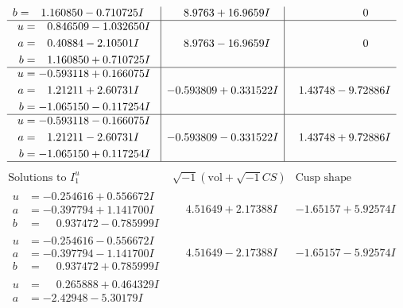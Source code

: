 \documentclass[1p]{elsarticle_modified}
\theoremstyle{definition}
\newcommand{\I}{\sqrt{-1}}
\begin{document}
$$\begin{array}{c|c|c}
\begin{aligned}
b &= \phantom{-}1.160850 - 0.710725 I\end{aligned}
 & \phantom{-}8.9763 + 16.9659 I & \phantom{-0.000000 } 0 \\ \hline\begin{aligned}
u &= \phantom{-}0.846509 - 1.032650 I \\
a &= \phantom{-}0.40884 - 2.10501 I \\
b &= \phantom{-}1.160850 + 0.710725 I\end{aligned}
 & \phantom{-}8.9763 - 16.9659 I & \phantom{-0.000000 } 0 \\ \hline\begin{aligned}
u &= -0.593118 + 0.166075 I \\
a &= \phantom{-}1.21211 + 2.60731 I \\
b &= -1.065150 - 0.117254 I\end{aligned}
 & -0.593809 + 0.331522 I & \phantom{-}1.43748 - 9.72886 I \\ \hline\begin{aligned}
u &= -0.593118 - 0.166075 I \\
a &= \phantom{-}1.21211 - 2.60731 I \\
b &= -1.065150 + 0.117254 I\end{aligned}
 & -0.593809 - 0.331522 I & \phantom{-}1.43748 + 9.72886 I\\
 \hline 
 \end{array}$$\newpage$$\begin{array}{c|c|c}  
\text{Solutions to }I^u_{1}& \I (\text{vol} + \sqrt{-1}CS) & \text{Cusp shape}\\
 \hline 
\begin{aligned}
u &= -0.254616 + 0.556672 I \\
a &= -0.397794 + 1.141700 I \\
b &= \phantom{-}0.937472 - 0.785999 I\end{aligned}
 & \phantom{-}4.51649 + 2.17388 I & -1.65157 + 5.92574 I \\ \hline\begin{aligned}
u &= -0.254616 - 0.556672 I \\
a &= -0.397794 - 1.141700 I \\
b &= \phantom{-}0.937472 + 0.785999 I\end{aligned}
 & \phantom{-}4.51649 - 2.17388 I & -1.65157 - 5.92574 I \\ \hline\begin{aligned}
u &= \phantom{-}0.265888 + 0.464329 I \\
a &= -2.42948 - 5.30179 I \\

\end{aligned}
\end{array}$$
\end{document}
